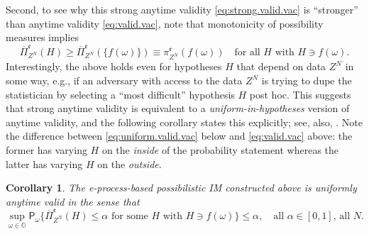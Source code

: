 \documentclass[a4paper, 12pt]{article}
\theoremstyle{plain}
\newtheorem{cor}{Corollary}
\theoremstyle{definition}
\theoremstyle{remark}
\newcommand{\prob}{\mathsf{P}}
\newcommand{\OO}{\mathbb{O}}
\newcommand{\uPi}{\overline{\Pi}}
\newcommand{\eval}{\mathfrak{e}}
\begin{document}
Second, to see why this strong anytime validity \eqref{eq:strong.valid.vac} is ``stronger'' than anytime validity \eqref{eq:valid.vac}, note that monotonicity of possibility measures implies
\begin{equation}
\label{eq:monotone}
\uPi_{Z^N}^\eval(H) \geq \uPi_{Z^N}^\eval(\{f(\omega)\}) \equiv \pi_{Z^N}^\eval(f(\omega)) \quad \text{for all $H$ with $H \ni f(\omega)$}.
\end{equation} 
Interestingly, the above holds even for hypotheses $H$ that depend on data $Z^N$ in some way, e.g., if an adversary with access to the data $Z^N$ is trying to dupe the statistician by selecting a ``most difficult'' hypothesis $H$ post hoc.  This suggests that strong anytime validity is equivalent to a {\em uniform-in-hypotheses} version of anytime validity, and the following corollary states this explicitly; see, also, \citet{cella.martin.probing}.  Note the difference between \eqref{eq:uniform.valid.vac} below and \eqref{eq:valid.vac} above: the former has varying $H$ on the {\em inside} of the probability statement whereas the latter has varying $H$ on the {\em outside}.  

\begin{cor}
\label{cor:uniform.vac}
The e-process-based possibilistic IM constructed above is uniformly anytime valid in the sense that 
\begin{equation}
\label{eq:uniform.valid.vac}
\sup_{\omega \in \OO} \prob_\omega\{ \uPi_{Z^N}^\eval(H) \leq \alpha \text{ for some $H$ with $H \ni f(\omega)$} \} \leq \alpha, \quad \text{all $\alpha \in [0,1]$, all $N$}. 
\end{equation}
\end{cor}

\end{document}
